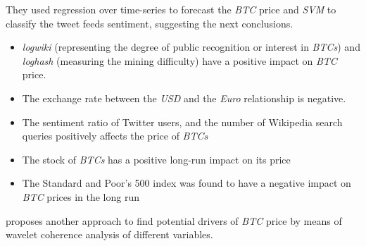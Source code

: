 They used regression over time-series to forecast the \textit{BTC}
price and \textit{SVM} to classify the tweet feeds sentiment,
suggesting the next conclusions.

\begin{itemize}
\item \textit{logwiki} (representing the degree of public recognition
  or interest in \textit{BTCs}) and \textit{loghash} (measuring the mining
  difficulty) have a positive impact on \textit{BTC} price.
\item The exchange rate between the \textit{USD} and the \textit{Euro}
  relationship is negative.
\item The sentiment ratio of Twitter users, and the number of
  Wikipedia search queries positively affects the price of \textit{BTCs}
\item The stock of \textit{BTCs} has a positive long-run impact on its
  price 
\item The Standard and Poor's 500 index was found to have a negative
  impact on \textit{BTC} prices in the long run
\end{itemize}

\cite{kristoufek_what_2015} proposes another approach to find
potential drivers of \textit{BTC} price by means of wavelet coherence
analysis of different variables.

